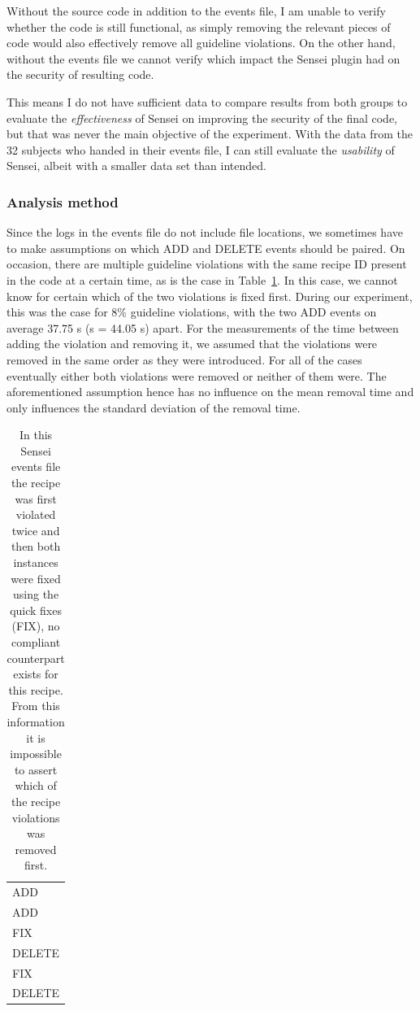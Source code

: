Without the source code in addition to the events file, I am unable to verify whether the code is still functional, as simply removing the relevant pieces of code would also effectively remove all guideline violations.
On the other hand, without the events file we cannot verify which impact the Sensei plugin had on the security of resulting code.

This means I do not have sufficient data to compare results from both groups to evaluate the \textit{effectiveness} of Sensei on improving the security of the final code, but that was never the main objective of the experiment.
With the data from the 32 subjects who handed in their events file, I can still evaluate the \textit{usability} of Sensei, albeit with a smaller data set than intended.

\subsubsection{Analysis method}
\label{sec:analysis}
Since the logs in the events file do not include file locations, we sometimes have to make assumptions on which ADD and DELETE events should be paired.
On occasion, there are multiple guideline violations with the same recipe ID present in the code at a certain time, as is the case in Table~\ref{tab:recipe2}. 
In this case, we cannot know for certain which of the two violations is fixed first.
During our experiment, this was the case for 8\% guideline violations, with the two ADD events on average 37.75 s (s = 44.05 s) apart.
For the measurements of the time between adding the violation and removing it, we assumed that the violations were removed in the same order as they were introduced.
For all of the cases eventually either both violations were removed or neither of them were.
The aforementioned assumption hence has no influence on the mean removal time and only influences the standard deviation of the removal time. 

\begin{table}
    \centering
    \begin{tabular}{|l|}
      \hline
      \cellcolor{scw-orange!30}
      ADD \\
      \cellcolor{scw-orange!30}
      ADD \\
      FIX \\
      \cellcolor{scw-teal!30}
      DELETE \\
      FIX \\
      \cellcolor{scw-teal!30}
      DELETE \\
      \hline
    \end{tabular}
    \caption[Sensei events file with multiple violations at the same time]{In this Sensei events file the recipe was first violated twice and then both instances were fixed using the quick fixes (FIX), no compliant counterpart exists for this recipe. From this information it is impossible to assert which of the recipe violations was removed first.}
    \label{tab:recipe2}
\end{table}

